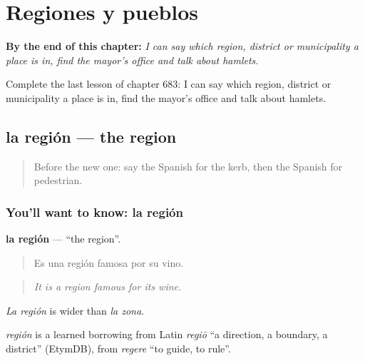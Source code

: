 
\chapter{Regiones y pueblos}
\label{ch:es-regiones-y-pueblos}

\begin{chapteropening}
\textbf{By the end of this chapter:} \emph{I can say which region, district or municipality a place is in, find the mayor’s office and talk about hamlets.}

Complete the last lesson of chapter 683: I can say which region, district or municipality a place is in, find the mayor’s office and talk about hamlets.
\end{chapteropening}

\section[la región]{la región — the region}

\label{lesson:ES-C683-region}



\begin{quote}
Before the new one: say the Spanish for the kerb, then the Spanish for pedestrian.
\end{quote}

\subsection*{You'll want to know: la región}
\textbf{la región} — \textquotedblleft{}the region\textquotedblright{}.

\begin{quote}
Es una región famosa por su vino.
\end{quote}

\begin{quote}
\emph{It is a region famous for its wine.}
\end{quote}

\emph{La región} is wider than \emph{la zona}.

\begin{cousinweb}
\emph{región} is a learned borrowing from Latin \emph{regiō} \textquotedblleft{}a direction, a boundary, a district\textquotedblright{} (EtymDB), from \emph{regere} \textquotedblleft{}to guide, to rule\textquotedblright{}.
\end{cousinweb}

